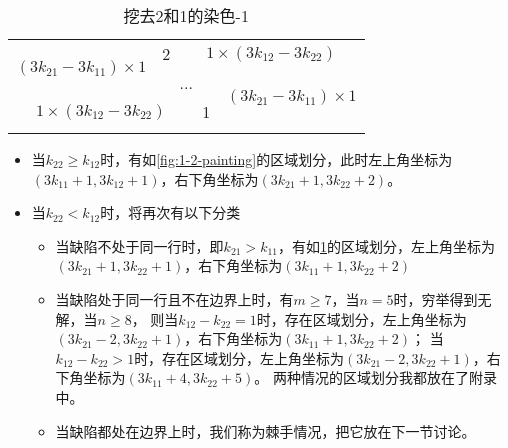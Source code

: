 \begin{table}[t]
	\centering
	\caption{挖去2和1的染色-1}
	\begin{tabular}{|cc|ccc|cc|}
		\hline
		\multicolumn{2}{|c|}{\multirow{3}{*}{$(3k_{21} - 3k_{11}) \times 1$}} & 2 & \multicolumn{4}{|c|}{$1 \times  (3k_{12} - 3k_{22})$}                                                                                 \\
		\cline{3-7}
		                                                                      &   & \multicolumn{3}{c}{\multirow{2}{*}{...}}              & \multicolumn{2}{|c|}{\multirow{3}{*}{$(3k_{21} - 3k_{11}) \times 1$}}         \\
		                                                                      &   &                                                       &                                                                       &  &  & \\
		\cline{1-5}
		\multicolumn{4}{|c|}{$1 \times  (3k_{12} - 3k_{22})$}                 & 1 &                                                       &                                                                               \\
		\hline
		\label{fig:2-1-painting-1}
	\end{tabular}
\end{table}

\begin{itemize}
	\item 当$k_{22} \ge k_{12}$时，有如\ref*{fig:1-2-painting}的区域划分，此时左上角坐标为$(3k_{11} + 1, 3k_{12} + 1)$，右下角坐标为$(3k_{21} + 1, 3k_{22} + 2)$。
	\item 当$k_{22} < k_{12}$时，将再次有以下分类
	      \begin{itemize}
		      \item 当缺陷不处于同一行时，即$k_{21} > k_{11}$，有如\ref*{fig:2-1-painting-1}的区域划分，左上角坐标为$(3k_{21} + 1, 3k_{22} + 1)$，右下角坐标为$(3k_{11} + 1, 3k_{22} + 2)$
		      \item 当缺陷处于同一行且不在边界上时，有$m \ge 7$，当$n = 5$时，穷举得到无解，当$n \ge 8$，
		            则当$k_{12} - k_{22} = 1$时，存在区域划分，左上角坐标为$(3k_{21}- 2, 3k_{22} + 1)$，右下角坐标为$(3k_{11} + 1, 3k_{22} + 2)$；
		            当$k_{12} - k_{22} > 1$时，存在区域划分，左上角坐标为$(3k_{21} - 2, 3k_{22} + 1)$，右下角坐标为$(3k_{11} + 4, 3k_{22} + 5)$。
		            两种情况的区域划分我都放在了附录中。
		      \item 当缺陷都处在边界上时，我们称为棘手情况，把它放在下一节讨论。
	      \end{itemize}
\end{itemize}



